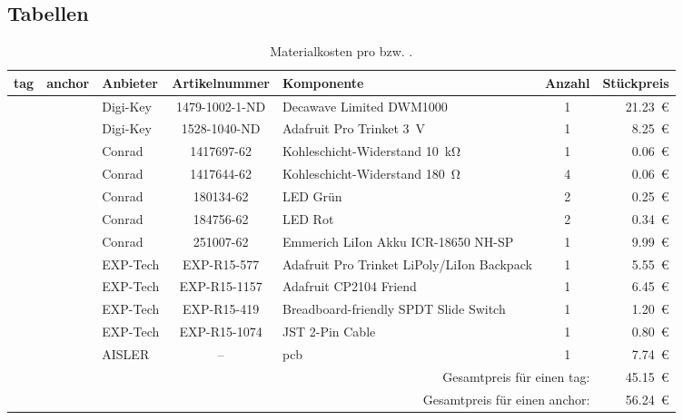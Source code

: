 \begin{appendices}
%
%
%
\chapter{Tabellen}

\begin{sidewaystable}[h]
	\centering
	\begin{tabular}{||c|c|l|c|l|c|r||} 
		\hline
		\gls{tag} & \gls{anchor} & Anbieter & Artikelnummer & Komponente & Anzahl & Stückpreis\\\hline
		\hline
		\CheckedBox & \CheckedBox & Digi-Key & 1479-1002-1-ND & Decawave Limited DWM1000 & 1 & \SI{21.23}{\euro}\\\hline
		\CheckedBox & \CheckedBox & Digi-Key & 1528-1040-ND & Adafruit Pro Trinket \SI{3}{\volt} & 1 & \SI{8.25}{\euro}\\\hline
		\hline
		\CheckedBox & \CheckedBox & Conrad & 1417697-62 & Kohleschicht-Widerstand \SI{10}{\kilo\ohm} & 1 & \SI{0.06}{\euro}\\\hline
		\CheckedBox & \CheckedBox & Conrad & 1417644-62 & Kohleschicht-Widerstand \SI{180}{\ohm} & 4 & \SI{0.06}{\euro}\\\hline
		\CheckedBox & \CheckedBox & Conrad & 180134-62 & LED Grün & 2 & \SI{0.25}{\euro}\\\hline
		\CheckedBox & \CheckedBox & Conrad & 184756-62 & LED Rot & 2 & \SI{0.34}{\euro}\\\hline
		\Square & \CheckedBox & Conrad & 251007-62 & Emmerich LiIon Akku ICR-18650 NH-SP & 1 & \SI{9.99}{\euro}\\\hline
		\hline
		\Square & \CheckedBox & EXP-Tech & EXP-R15-577 & Adafruit Pro Trinket LiPoly/LiIon Backpack & 1 & \SI{5.55}{\euro}\\\hline
		\CheckedBox & \Square & EXP-Tech & EXP-R15-1157 & Adafruit CP2104 Friend & 1 & \SI{6.45}{\euro}\\\hline
		\Square & \CheckedBox & EXP-Tech & EXP-R15-419 & Breadboard-friendly SPDT Slide Switch & 1 & \SI{1.20}{\euro}\\\hline
		\Square & \CheckedBox & EXP-Tech & EXP-R15-1074 & JST 2-Pin Cable & 1 & \SI{0.80}{\euro}\\\hline
		\hline
		\CheckedBox & \CheckedBox & AISLER & -- & \acrlong{pcb} & 1 & \SI{7.74}{\euro}\\\hline
		\hline
		\multicolumn{6}{|r|}{Gesamtpreis für einen \gls{tag}:} & \SI{45.15}{\euro}\\\hline
		\multicolumn{6}{|r|}{Gesamtpreis für einen \gls{anchor}:} & \SI{56.24}{\euro}\\\hline
	\end{tabular}
	\caption{Materialkosten pro  bzw. .}
	\label{tab:kosten_pro_modul}
\end{sidewaystable}



\end{appendices}
